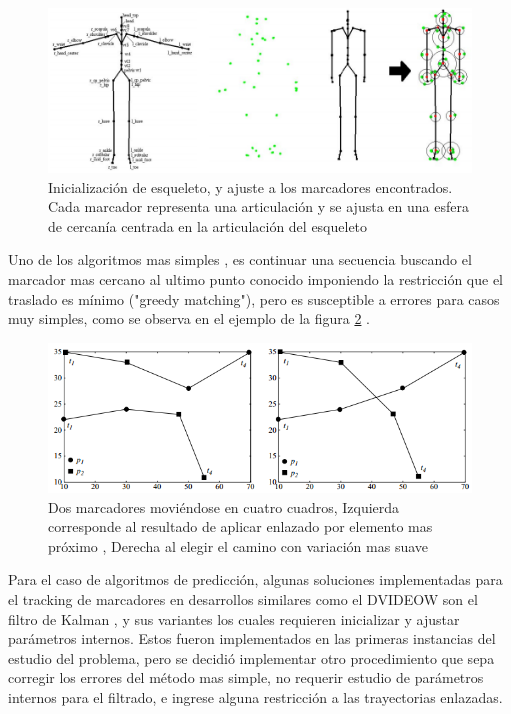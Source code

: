 \begin{figure}[hbt]
\begin{center}
\includegraphics[scale=0.5]{img/Tracking/01_skeleton_fitting_Herda.png}
\end{center}
\caption{Inicialización de esqueleto, y ajuste a los marcadores encontrados. Cada marcador representa una articulación y se ajusta en una esfera de cercanía centrada en la articulación del esqueleto}
\label{skeleton_fitting_herda}
\end{figure}

Uno de los algoritmos mas simples \cite{survey_tracking}, es continuar una secuencia buscando el marcador mas cercano al ultimo punto conocido imponiendo la restricción que el traslado es mínimo ("greedy matching"), pero es susceptible a errores para casos muy simples, como se observa en el ejemplo de la figura \ref{greedy_matching} .

\begin{figure}[hbt]
\begin{center}
\includegraphics[scale=0.8]{img/Tracking/01_Greedy_Matching.png}
\end{center}
\caption{Dos marcadores moviéndose en cuatro cuadros, Izquierda corresponde al resultado de aplicar enlazado por elemento mas próximo \cite{survey_tracking} , Derecha al elegir el camino con variación mas suave}
\label{greedy_matching}
\end{figure}

Para el caso de algoritmos de predicción, algunas soluciones implementadas para el tracking de marcadores en desarrollos similares como el DVIDEOW \cite{figueroa2003flexible} son el filtro de Kalman \cite{kalman}, y sus variantes los cuales requieren inicializar y ajustar parámetros internos. Estos fueron implementados en las primeras instancias del estudio del problema, pero se decidió implementar otro procedimiento que sepa corregir los errores del método mas simple, no requerir estudio de parámetros internos para el filtrado, e ingrese alguna restricción a las trayectorias enlazadas.
\\ 

